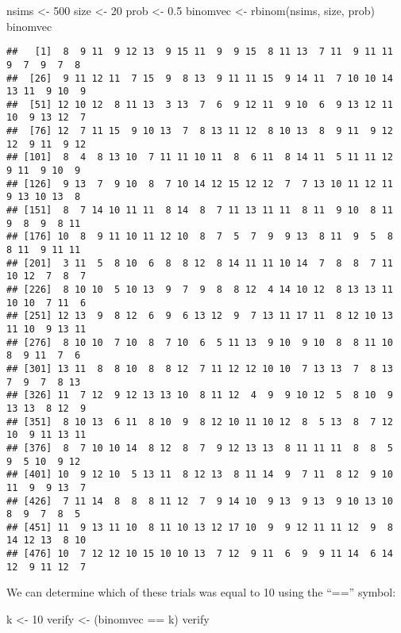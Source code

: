 \documentclass[
]{book}
\newenvironment{Shaded}{\begin{snugshade}}{\end{snugshade}}
\newcommand{\DecValTok}[1]{\textcolor[rgb]{0.00,0.00,0.81}{#1}}
\newcommand{\FloatTok}[1]{\textcolor[rgb]{0.00,0.00,0.81}{#1}}
\newcommand{\FunctionTok}[1]{\textcolor[rgb]{0.00,0.00,0.00}{#1}}
\newcommand{\NormalTok}[1]{#1}
\newcommand{\OtherTok}[1]{\textcolor[rgb]{0.56,0.35,0.01}{#1}}
\newcommand{\SpecialCharTok}[1]{\textcolor[rgb]{0.00,0.00,0.00}{#1}}
\begin{document}
\begin{Shaded}
\begin{Highlighting}[]
\NormalTok{nsims }\OtherTok{\textless{}{-}} \DecValTok{500}
\NormalTok{size }\OtherTok{\textless{}{-}} \DecValTok{20}
\NormalTok{prob }\OtherTok{\textless{}{-}} \FloatTok{0.5}
\NormalTok{binomvec }\OtherTok{\textless{}{-}} \FunctionTok{rbinom}\NormalTok{(nsims, size, prob)}
\NormalTok{binomvec}
\end{Highlighting}
\end{Shaded}

\begin{verbatim}
##   [1]  8  9 11  9 12 13  9 15 11  9  9 15  8 11 13  7 11  9 11 11  9  7  9  7  8
##  [26]  9 11 12 11  7 15  9  8 13  9 11 11 15  9 14 11  7 10 10 14 13 11  9 10  9
##  [51] 12 10 12  8 11 13  3 13  7  6  9 12 11  9 10  6  9 13 12 11 10  9 13 12  7
##  [76] 12  7 11 15  9 10 13  7  8 13 11 12  8 10 13  8  9 11  9 12 12  9 11  9 12
## [101]  8  4  8 13 10  7 11 11 10 11  8  6 11  8 14 11  5 11 11 12  9 11  9 10  9
## [126]  9 13  7  9 10  8  7 10 14 12 15 12 12  7  7 13 10 11 12 11  9 13 10 13  8
## [151]  8  7 14 10 11 11  8 14  8  7 11 13 11 11  8 11  9 10  8 11  9  8  9  8 11
## [176] 10  8  9 11 10 11 12 10  8  7  5  7  9  9 13  8 11  9  5  8  8 11  9 11 11
## [201]  3 11  5  8 10  6  8  8 12  8 14 11 11 10 14  7  8  8  7 11 10 12  7  8  7
## [226]  8 10 10  5 10 13  9  7  9  8  8 12  4 14 10 12  8 13 13 11 10 10  7 11  6
## [251] 12 13  9  8 12  6  9  6 13 12  9  7 13 11 17 11  8 12 10 13 11 10  9 13 11
## [276]  8 10 10  7 10  8  7 10  6  5 11 13  9 10  9 10  8  8 11 10  8  9 11  7  6
## [301] 13 11  8  8 10  8  8 12  7 11 12 12 10 10  7 13 13  7  8 13  7  9  7  8 13
## [326] 11  7 12  9 12 13 13 10  8 11 12  4  9  9 10 12  5  8 10  9 13 13  8 12  9
## [351]  8 10 13  6 11  8 10  9  8 12 10 11 10 12  8  5 13  8  7 12 10  9 11 13 11
## [376]  8  7 10 10 14  8 12  8  7  9 12 13 13  8 11 11 11  8  8  5  9  5 10  9 12
## [401] 10  9 12 10  5 13 11  8 12 13  8 11 14  9  7 11  8 12  9 10 11  9  9 13  7
## [426]  7 11 14  8  8  8 11 12  7  9 14 10  9 13  9 13  9 10 13 10  8  9  7  8  5
## [451] 11  9 13 11 10  8 11 10 13 12 17 10  9  9 12 11 11 12  9  8 14 12 13  8 10
## [476] 10  7 12 12 10 15 10 10 13  7 12  9 11  6  9  9 11 14  6 14 12  9 11 12  7
\end{verbatim}

We can determine which of these trials was equal to 10 using the ``=='' symbol:

\begin{Shaded}
\begin{Highlighting}[]
\NormalTok{k }\OtherTok{\textless{}{-}} \DecValTok{10}
\NormalTok{verify }\OtherTok{\textless{}{-}}\NormalTok{ (binomvec }\SpecialCharTok{==}\NormalTok{ k)}
\NormalTok{verify}
\end{Highlighting}
\end{Shaded}
\end{document}
